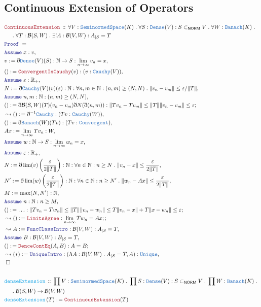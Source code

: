 \documentclass[12pt]{scrartcl}
\newcommand{\TYPE}[1]{\textcolor{NavyBlue}{\mathtt{#1}}}
\newcommand{\FUNC}[1]{\textcolor{Cerulean}{\mathtt{#1}}}
\newcommand{\LOGIC}[1]{\textcolor{Blue}{\mathtt{#1}}}
\newcommand{\THM}[1]{\textcolor{Maroon}{\mathtt{#1}}}
\renewcommand{\.}{\; . \;}
\newcommand{\de}{: \kern 0.1pc =}
\newcommand{\Act}[1]{\left( #1 \right)}
\newcommand{\Theorem}[2]{& \THM{#1} \, :: \, #2 \\ & \Proof = \\ }
\newcommand{\DeclareFunc}[2]{& \FUNC{#1} \, :: \, #2 \\}
\newcommand{\DefineFunc}[3]{&  \FUNC{#1}\Act{#2} \de #3 \\}
\newcommand{\NewLine}{\\ & \kern 1pc}
\newcommand{\Page}[1]{\begin{align*} #1 \end{align*} \newpage   }
\newcommand{ \bd }{ \ByDef }
\newcommand{\Reals}{\mathbb{R} }
\newcommand{\Nat}{\mathbb{N} }
\newcommand{\Say}[3]{& #1 \de #2 : #3, \\}
\newcommand{\Conclude}[3]{& #1 \de #2 : #3; \\}
\newcommand{\Derive}[3]{& \leadsto #1 \de #2 : #3, \\}
\newcommand{\DeriveConclude}[3]{& \leadsto #1 \de #2 : #3 ; \\}
\newcommand{\A}{\LOGIC{Assume} \;}
\newcommand{\Assume}[2]{& \A #1 : #2, \\}
\newcommand{\QED}{\; \square}
\newcommand{\EndProof}{& \QED \\}
\newcommand{\ByDef}{\eth}
\newcommand{\Proof}{\LOGIC{Proof} \; }
\newcommand{\Dense}{\TYPE{Dense}}
\newcommand{\SNS}{\TYPE{SeminormedSpace}}
\newcommand{\Banach}{\TYPE{Banach}}
\newcommand{\NORM}{\textsf{NORM}}
\newcommand{\B}{\mathcal{B}}
\begin{document}
\subsection{Continuous Extension of Operators}
\Page{
\Theorem{ContinuousExtension}{ \forall V : \SNS(K) \. \forall S : \Dense(V) : S \subset_\NORM V \. \forall W : \Banach(K) \. \NewLine
\.
\forall T : \B(S,W) \. \exists ! A : \B(V,W) : A_{|S} = T}
\Assume{x}{v}
\Say{v}{\bd \Dense(V)(S)}{\Nat \to S : \lim_{n \to \infty} v_n = x}
\Say{()}{\THM{ConvergentIsCauchy}(v)}{(v : \TYPE{Cauchy}(V))}
\Assume{\varepsilon}{\Reals_+}
\Say{N}{\bd \TYPE{Cauchy}(V)(v)(\varepsilon)}{\Nat : \forall n,m \in \Nat : (n,m) \ge (N,N) 
\.  \| v_n - v_m  \| \le \varepsilon /  \| T \|
}
\Assume{n,m}{\Nat : (n,m) \ge (N,N)}
\Conclude{ () }{ \bd \B(S,W)(T)(v_n - v_m) \bd N (\bd(n,m))}{ \| T v_n - T v_m \| \le \| T \| \| v_n - v_m \|  \le \varepsilon} 
\Derive{()}{\bd^{-1} \TYPE{Cauchy}}{ (Tv : \TYPE{Cauchy}(W))}
\Say{()}{\bd \Banach(W)(Tv)}{(Tv : \TYPE{Convergent})}
\Say{Ax}{\lim_{n \to \infty} Tv_n}{W}
\Assume{w}{\Nat \to S : \lim_{n \to \infty} w_n = x}
\Assume{\varepsilon}{\Reals_+}
\Say{N}{\bd \lim (v)\left(\frac{\varepsilon}{2\|T\|}\right)}
{\Nat : \forall n \in \Nat : n \ge N \. \| v_n - x  \| \le  \frac{\varepsilon}{2\|T\|}}
\Say{N'}{\bd \lim (w)\left(\frac{\varepsilon}{2\|T\|}\right)}
{\Nat : \forall n \in \Nat : n \ge N' \. \| w_n - Ax  \| \le  \frac{\varepsilon}{2\|T\|}}
\Say{M}{\max(N,N')}{\Nat}
\Assume{n}{\Nat : n \ge M}
\Conclude{()}{\ldots}{ \| Tv_n - Tw_n \| \le \|T\|\| v_n - w_n \| \le T\|v_n - x\| + T\| x - w_n \| \le \varepsilon }
\DeriveConclude{()}{\THM{LimitsAgree}}{ \lim_{n \to \infty} Tw_n = Ax ;}
\Derive{A}{\LOGIC{FuncClassIntro}}{\B(V,W) : A_{|S} = T}
\Assume{B}{\B(V,W) : B_{|S} = T}
\Conclude{()}{\THM{DenceContEq}(A,B)}{A = B}
\Derive{(*)}{\LOGIC{UniqueIntro}}{(\Lambda A : \B(V,W) \. A_{|S} = T,A) : \TYPE{Unique}}
\EndProof
\\
\DeclareFunc{denseExtension}{ \prod V : \SNS(K) \. \prod S : \Dense(V) : S \subset_\NORM V \. \prod W : \Banach(K) \. \NewLine
\.
 \B(S,W)  \to  \B(V,W) }
\DefineFunc{denseExtension}{T}{\THM{ContinuousExtension}(T)}  
}
\end{document}
